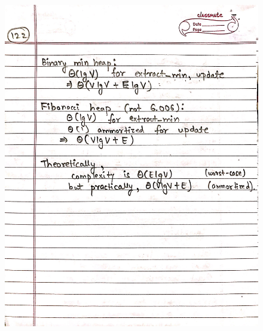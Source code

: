 \begin{figure}[H]
    \centering
    \includegraphics[scale=0.25]{"./MIT 6.006/MIT_6006_122"}
\end{figure}
\newpage

